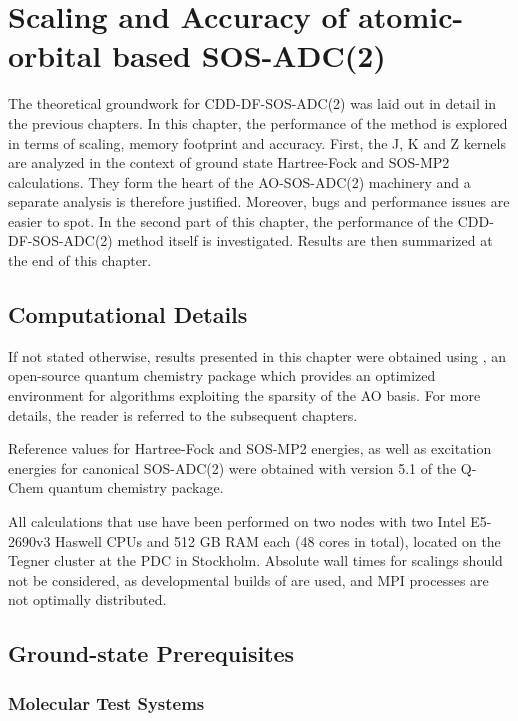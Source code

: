 \chapter{Scaling and Accuracy of atomic-orbital based SOS-ADC(2)}

The theoretical groundwork for CDD-DF-SOS-ADC(2) was laid out in detail in the previous chapters. In this chapter, the performance of the method is explored in terms of scaling, memory footprint and accuracy. First, the J, K and Z kernels are analyzed in the context of ground state Hartree-Fock and SOS-MP2 calculations. They form the heart of the AO-SOS-ADC(2) machinery and a separate analysis is therefore justified. Moreover, bugs and performance issues are easier to spot. In the second part of this chapter, the performance of the CDD-DF-SOS-ADC(2) method itself is investigated. Results are then summarized at the end of this chapter. 

\section{Computational Details}

If not stated otherwise, results presented in this chapter were obtained using \mchem{}, an open-source quantum chemistry package which provides an optimized environment for algorithms exploiting the sparsity of the AO basis. For more details, the reader is referred to the subsequent chapters.

Reference values for Hartree-Fock and SOS-MP2 energies, as well as excitation energies for canonical SOS-ADC(2) were obtained with version 5.1 of the Q-Chem quantum chemistry package.

All calculations that use \mchem{} have been performed on two nodes with two Intel E5-2690v3 Haswell CPUs and 512 GB RAM each (48 cores in total), located on the Tegner cluster at the PDC in Stockholm. Absolute wall times for scalings should not be considered, as developmental builds of \mchem{} are used, and MPI processes are not optimally distributed.  

\section{Ground-state Prerequisites}

\subsection{Molecular Test Systems}

